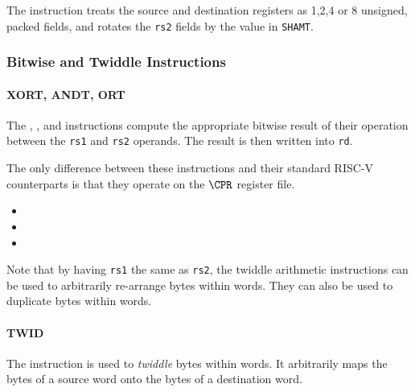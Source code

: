 The instruction  treats the source and destination registers as
1,2,4 or 8 unsigned, packed fields, and rotates the {\tt rs2} fields by
the value in {\tt SHAMT}.

\subsubsection{Bitwise and Twiddle Instructions}

\paragraph{XORT, ANDT, ORT}

The , , and  instructions compute the
appropriate bitwise result of their operation between the {\tt rs1} and
{\tt rs2} operands. The result is then written into {\tt rd}.

The only difference between these instructions and their standard RISC-V
counterparts is that they operate on the $\CPR$ register file.

\begin{itemize}
\item {}
\item {}
\item {}
\end{itemize}

Note that by having {\tt rs1} the same as {\tt rs2}, the twiddle
arithmetic instructions can be used to arbitrarily re-arrange bytes
within words. They can also be used to duplicate bytes within words.

\paragraph{TWID}

The  instruction is used to {\em twiddle} bytes within words.
It arbitrarily maps the bytes of a source word onto the bytes of a
destination word.

